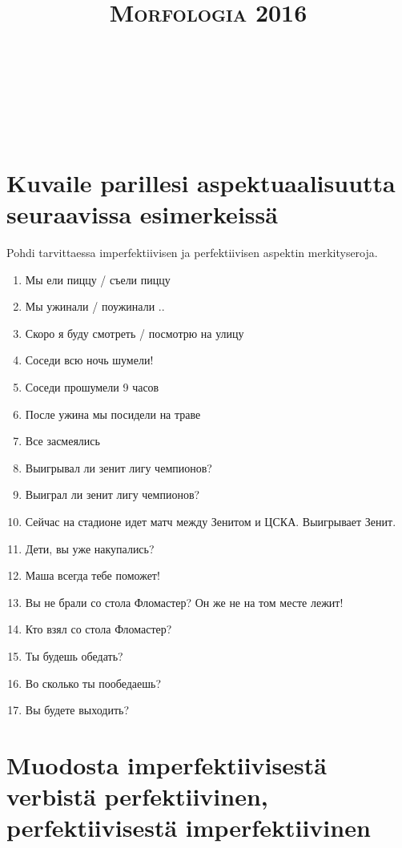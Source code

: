 \documentclass[paper=a4, fontsize=11pt]{scrartcl}
\title{	
\normalfont \normalsize 
\textsc{Morfologia 2016} \\ [25pt] 
\horrule{0.5pt} \\[0.4cm] 
\huge  \\ 
\horrule{2pt} \\[0.5cm] 
}
\date{}
\begin{document}
\onehalfspacing


\section{Kuvaile parillesi aspektuaalisuutta seuraavissa esimerkeissä}

Pohdi tarvittaessa imperfektiivisen ja perfektiivisen aspektin merkityseroja.

\begin{enumerate}
     \item Мы ели пиццу / съели пиццу
     \item Мы ужинали / поужинали ..
     \item Скоро я буду смотреть / посмотрю на улицу
     \item Соседи всю ночь шумели! 
     \item Соседи прошумели 9 часов
     \item После ужина мы посидели на траве 
     \item Все засмеялись
     \item Выигрывал ли зенит лигу чемпионов?
     \item Выиграл ли зенит лигу чемпионов?
     \item Сейчас на стадионе идет матч между Зенитом и ЦСКА. Выигрывает Зенит.
     \item Дети, вы уже накупались?
     \item Маша всегда тебе поможет!
     \item Вы не брали со стола Фломастер? Он же не на том месте лежит!
     \item Кто взял со стола Фломастер?
     \item Ты будешь обедать?
     \item Во сколько ты пообедаешь?
     \item Вы будете выходить?
\end{enumerate}


\section{Muodosta imperfektiivisestä verbistä perfektiivinen, perfektiivisestä imperfektiivinen}
\end{document}
